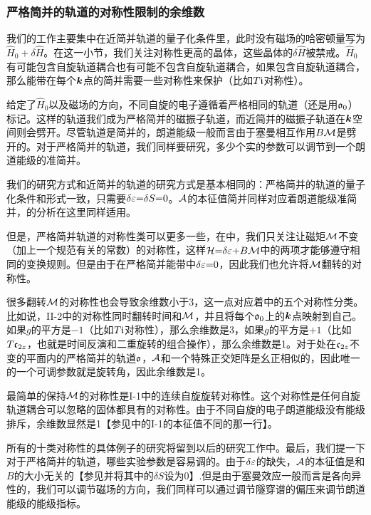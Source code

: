 \subsubsection{严格简并的轨道的对称性限制的余维数}\label{sec:codimexactdeg}

我们的工作主要集中在近简并轨道的量子化条件里，此时没有磁场的哈密顿量写为$\hat{H}_0{+}\delta \hat{H}$。在这一小节，我们关注对称性更高的晶体，这些晶体的$\delta \hat{H}$被禁戒。$\hat{H}_0$有可能包含自旋轨道耦合也有可能不包含自旋轨道耦合，如果包含自旋轨道耦合，那么能带在每个$\boldsymbol{k}$点的简并需要一些对称性来保护（比如$T\mathfrak{i}$对称性）。


给定了$\hat{H}_0$以及磁场的方向，不同自旋的电子遵循着严格相同的轨道（还是用$\mathfrak{o}_0$）标记。这样的轨道我们成为严格简并的磁振子轨道，而近简并的磁振子轨道在$\boldsymbol{k}$空间则会劈开。尽管轨道是简并的，朗道能级一般而言由于塞曼相互作用$B{\cal M}$是劈开的。对于严格简并的轨道，我们同样要研究，多少个实的参数可以调节到一个朗道能级的准简并。


我们的研究方式和近简并的轨道的研究方式是基本相同的：严格简并的轨道的量子化条件\cite{topoferm}和形式一致，只需要$\delta \varepsilon{=}\delta S{=}0$。${\cal A}$的本征值简并同样对应着朗道能级准简并，的分析在这里同样适用。

但是，严格简并轨道的对称性类可以更多一些，在中，我们只关注让磁矩${\cal M}$不变（加上一个规范有关的常数\cite{100p}）的对称性，这样${\cal H}{=}\delta \varepsilon{+}B{\cal M}$中的两项才能够遵守相同的变换规则。但是由于在严格简并能带中$\delta\varepsilon{=}0$，因此我们也允许将${\cal M}$翻转的对称性。

很多翻转${\cal M}$的对称性也会导致余维数小于3，这一点对应着中的五个对称性分类。比如说，II-2中的对称性同时翻转时间和${\cal M}$，并且将每个$\mathfrak{o}_0$上的$\boldsymbol{k}$点映射到自己。如果$g$的平方是$-1$（比如$T\mathfrak{i}$对称性），那么余维数是3，如果$g$的平方是$+1$（比如$T\mathfrak{c}_{2z}$，也就是时间反演和二重旋转的组合操作），那么余维数是1。对于处在$\mathfrak{c}_{2z}$不变的平面内的严格简并的轨道$\mathfrak{o}$，${\cal A}$和一个特殊正交矩阵是幺正相似的\cite{100p,alexandradinata_berry-phase_2016}，因此唯一的一个可调参数就是旋转角，因此余维数是1。


最简单的保持${\cal M}$的对称性是I-1中的连续自旋旋转对称性。这个对称性是任何自旋轨道耦合可以忽略的固体都具有的对称性。由于不同自旋的电子朗道能级没有能级排斥，余维数显然是1【参见中的I-1的本征值不同的那一行】。

所有的十类对称性的具体例子的研究将留到以后的研究工作中。最后，我们提一下对于严格简并的轨道，哪些实验参数是容易调的。由于$\delta\varepsilon$的缺失，${\cal A}$的本征值是和$B$的大小无关的【参见并将其中的$\delta S$设为0】.但是由于塞曼效应一般而言是各向异性的，我们可以调节磁场的方向，我们同样可以通过调节隧穿谱的偏压来调节朗道能级的能级指标。

